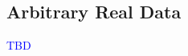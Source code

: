 \documentclass{article}
\newcommand{\Z}[0]{\mathbb{Z}}		%
\newcommand{\Q}[0]{\mathbb{Q}}		%
\newtheorem{conj}[thm]{Conjecture}
\theoremstyle{definition}
\theoremstyle{remark}
\begin{document}
\subsection{Arbitrary Real Data}
\textcolor{blue}{TBD}
\end{document}
